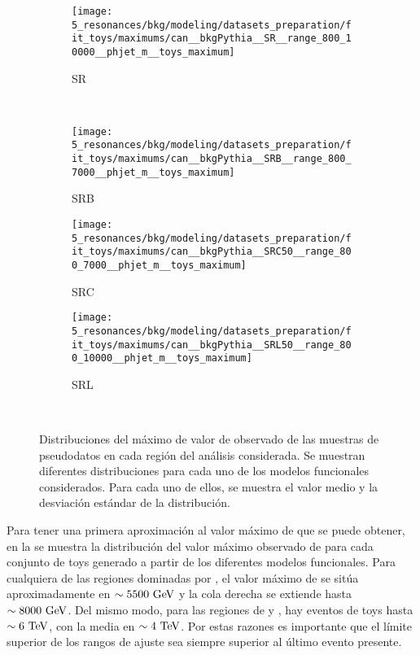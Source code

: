 \begin{figure}[ht!]
    \centering
    \begin{subfigure}[h]{0.32\linewidth}
        \centering
        \texttt{[image: 5\_resonances/bkg/modeling/datasets\_preparation/fit\_toys/maximums/can\_\_bkgPythia\_\_SR\_\_range\_800\_10000\_\_phjet\_m\_\_toys\_maximum]}
        \caption{SR}
    \end{subfigure}\\
    \begin{subfigure}[h]{0.32\linewidth}
        \centering
        \texttt{[image: 5\_resonances/bkg/modeling/datasets\_preparation/fit\_toys/maximums/can\_\_bkgPythia\_\_SRB\_\_range\_800\_7000\_\_phjet\_m\_\_toys\_maximum]}
        \caption{SRB}
    \end{subfigure}
    \begin{subfigure}[h]{0.32\linewidth}
        \centering
        \texttt{[image: 5\_resonances/bkg/modeling/datasets\_preparation/fit\_toys/maximums/can\_\_bkgPythia\_\_SRC50\_\_range\_800\_7000\_\_phjet\_m\_\_toys\_maximum]}
        \caption{SRC}
    \end{subfigure}
    \begin{subfigure}[h]{0.32\linewidth}
        \centering
        \texttt{[image: 5\_resonances/bkg/modeling/datasets\_preparation/fit\_toys/maximums/can\_\_bkgPythia\_\_SRL50\_\_range\_800\_10000\_\_phjet\_m\_\_toys\_maximum]}
        \caption{SRL}
    \end{subfigure}\\
    \caption{Distribuciones del máximo de valor de \myj observado de las muestras de pseudodatos en cada región del análisis considerada. Se muestran diferentes distribuciones para cada uno de los modelos funcionales considerados. Para cada uno de ellos, se muestra el valor medio y la desviación estándar de la distribución.}
    \label{fig:bkg:modeling:preparation:toys:toys_maximums}
\end{figure}

Para tener una primera aproximación al valor máximo de \myj que se puede obtener, en la \Fig{\ref{fig:bkg:modeling:preparation:toys:toys_maximums}} se muestra la distribución del valor máximo observado de \myj para cada conjunto de toys generado a partir de los diferentes modelos funcionales. Para cualquiera de las regiones dominadas por \ljets, el valor máximo de \myj se sitúa aproximadamente en \(\sim 5500~\text{GeV}\) y la cola derecha se extiende hasta \(\sim 8000~\text{GeV}\). Del mismo modo, para las regiones de \cjets y \bjets, hay eventos de toys hasta \(\sim 6~\text{TeV}\), con la media en \(\sim 4~\text{TeV}\). Por estas razones es importante que el límite superior de los rangos de ajuste sea siempre superior al último evento presente.
























